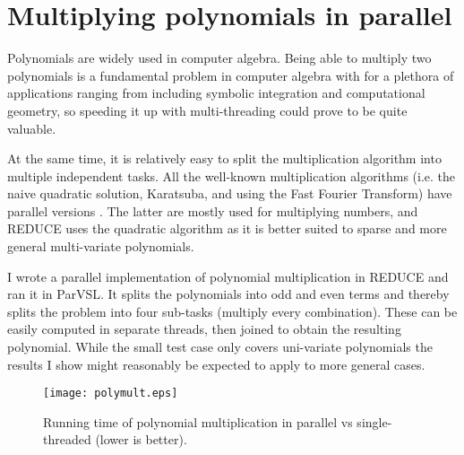 \section{Multiplying polynomials in parallel}

Polynomials are widely used in computer algebra. Being able
to multiply two polynomials is a fundamental problem in computer
algebra with for a plethora of applications ranging from
including symbolic integration and computational geometry,
so speeding it up with multi-threading could prove to be quite valuable.

At the same time, it is relatively easy to split the multiplication
algorithm into multiple independent tasks. All the well-known
multiplication algorithms (i.e. the naive quadratic solution, Karatsuba,
and using the Fast Fourier Transform) have parallel versions \cite[Chapter~30.3]{cormen}.
The latter are mostly used for multiplying numbers, and REDUCE
uses the quadratic algorithm as it is better suited to sparse and
more general multi-variate polynomials.

I wrote a parallel implementation of polynomial multiplication in REDUCE
and ran it in ParVSL. It splits the polynomials into odd and even
terms and thereby splits the problem into four sub-tasks (multiply every combination).
These can be easily computed in separate threads, then joined to obtain the
resulting polynomial. While the small test case only covers uni-variate
polynomials the results I show might reasonably be expected to apply to
more general cases.


\begin{figure}[H]
  \centering
  \texttt{[image: polymult.eps]}
  \caption{Running time of polynomial multiplication in parallel vs single-threaded (lower is better).}
  \label{fig:parpolymult}
\end{figure}

